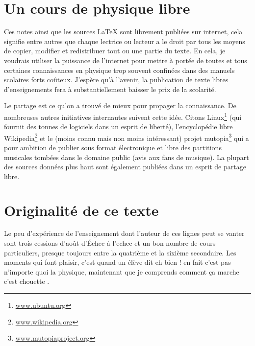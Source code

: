 					\section{Un cours de physique libre}

Ces notes ainsi que les sources \LaTeX{} sont librement publiées sur internet, cela signifie entre autres que chaque lectrice ou lecteur a le droit par tous les moyens de copier, modifier et redistribuer tout ou une partie du texte. En cela, je voudrais utiliser la puissance de l'internet pour mettre à portée de toutes et tous certaines connaissances en physique trop souvent confinées dans des manuels scolaires forts coûteux. J'espère qu'à l'avenir, la publication de texte libres d'enseignements fera à substantiellement baisser le prix de la scolarité.

Le partage est ce qu'on a trouvé de mieux pour propager la connaissance. De nombreuses autres initiatives internautes suivent cette idée. Citons Linux\footnote{\href{www.ubuntu.org}{www.ubuntu.org}} (qui fournit des tonnes de logiciels dans un esprit de liberté), l'encyclopédie libre Wikipedia\footnote{\href{www.wikipedia.org}{www.wikipedia.org}} et le (moins connu mais non moins intéressant) projet mutopia\footnote{\href{www.mutopiaproject.org}{www.mutopiaproject.org}} qui a pour ambition de publier sous format électronique et libre des partitions musicales tombées dans le domaine public (avis aux fans de musique). La plupart des sources données plus haut sont également publiées dans un esprit de partage libre.


					\section{Originalité de ce texte}

Le peu d'expérience de l'enseignement dont l'auteur de ces lignes peut se vanter sont trois cessions d'août d'Échec à l'echec et un bon nombre de cours particuliers, presque toujours entre la quatrième et la sixième secondaire. Les moments qui font plaisir, c'est quand un élève dit \og eh bien ! en fait c'est pas n'importe quoi la physique, maintenant que je comprends comment ça marche c'est chouette \fg.
   
